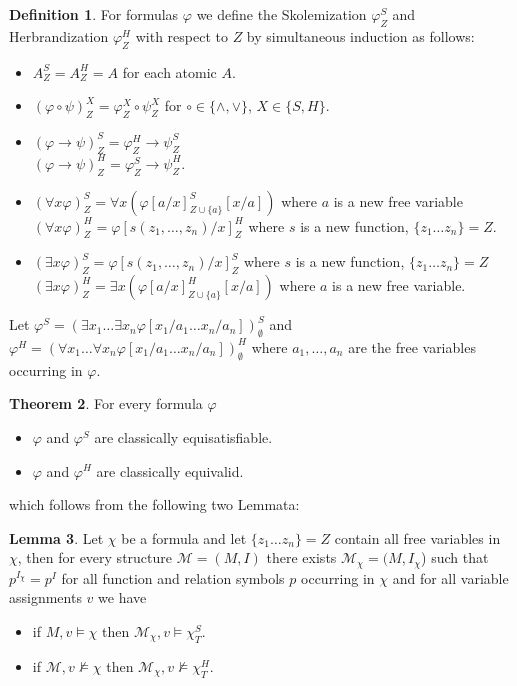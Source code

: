 \documentclass[a4paper,11pt]{report}
\theoremstyle{definition}
\newtheorem{theorem}{Theorem}[section]
\theoremstyle{definition}
\theoremstyle{definition}
\newtheorem{lemma}[theorem]{Lemma}
\theoremstyle{definition}
\theoremstyle{definition}
\newtheorem{definition}[theorem]{Definition}
\theoremstyle{definition}
\theoremstyle{definition}
\begin{document}
	\begin{definition}
		For formulas $\varphi$ we define the Skolemization $\varphi^S_Z$ and Herbrandization $\varphi^H_Z$ with respect to $Z$ by simultaneous induction as follows:
		\begin{itemize}
			\item $A^S_Z = A^H_Z = A$ for each atomic $A$.
			\item $(\varphi\circ\psi)^X_Z = \varphi^X_Z\circ\psi^X_Z$ for $\circ\in\{\wedge, \vee\}$, $X\in\{S, H\}$.
			\item $(\varphi\to\psi)^S_Z = \varphi^H_Z\to \psi^S_Z$\\$(\varphi\to\psi)^H_Z = \varphi^S_Z\to\psi^H_Z$.
			\item $(\forall x\varphi)^S_Z = \forall x(\varphi[a/x]^S_{Z\cup\{a\}}[x/a])$ where $a$ is a new free variable\\$(\forall x\varphi)^H_Z = \varphi[s(z_1,\dots,z_n)/x]^H_Z$ where $s$ is a new function, $\{z_1\dots z_n\} = Z$.
			\item $(\exists x\varphi)^S_Z = \varphi[s(z_1,\dots,z_n)/x]^S_Z$ where $s$ is a new function, $\{z_1\dots z_n\} = Z$\\$(\exists x\varphi)^H_Z = \exists x(\varphi[a/x]^H_{Z\cup\{a\}}[x/a])$ where $a$ is a new free variable.
		\end{itemize}
		Let $\varphi^S = (\exists x_1\dots\exists x_n \varphi[x_1/a_1\dots x_n/a_n])^S_\emptyset$ and $\varphi^H = (\forall x_1\dots\forall x_n \varphi[x_1/a_1\dots x_n/a_n])^H_\emptyset$ where $a_1,\dots,a_n$ are the free variables occurring in $\varphi$.
	\end{definition}
	
	\begin{theorem}
		\label{thm:herbrand-skolem}
		For every formula $\varphi$
		\begin{itemize}
			\item $\varphi$ and $\varphi^S$ are classically equisatisfiable.
			\item $\varphi$ and $\varphi^H$ are classically equivalid.
		\end{itemize}
	\end{theorem}
	which follows from the following two Lemmata:
	\begin{lemma}
		Let $\chi$ be a formula and let $\{z_1\dots z_n\} = Z$ contain all free variables in $\chi$, then for every structure $\mathcal M = (M, I)$ there exists $\mathcal M_\chi = (M, I_\chi$) such that $p^{I_{\chi}} = p^I$ for all function and relation symbols $p$ occurring in $\chi$ and for all variable assignments $v$ we have
		\begin{itemize}
			\item if $M, v \models\chi$ then $\mathcal M_\chi, v\models\chi^S_T$.
			\item if $\mathcal M, v\not\models\chi$ then $\mathcal M_\chi, v\not\models\chi^H_T$.
		\end{itemize}
	\end{lemma}
	
\end{document}
